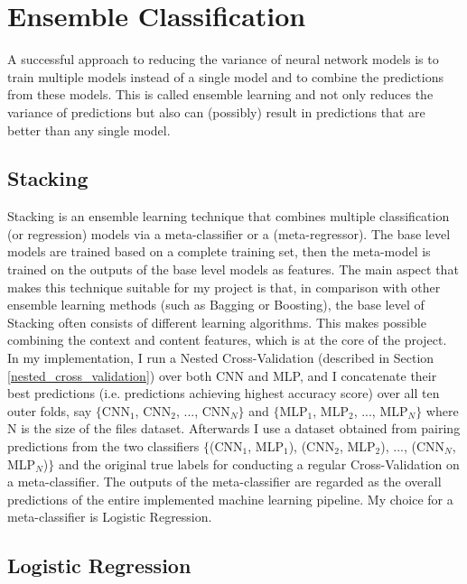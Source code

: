 \section{Ensemble Classification}

A successful approach to reducing the variance of neural network models is to train multiple models instead of a single model and to combine the predictions from these models. This is called ensemble learning and not only reduces the variance of predictions but also can (possibly) result in predictions that are better than any single model. \\

\subsection{Stacking}

Stacking is an ensemble learning technique that combines multiple classification (or regression) models via a meta-classifier or a (meta-regressor). The base level models are trained based on a complete training set, then the meta-model is trained on the outputs of the base level models as features. The main aspect that makes this technique suitable for my project is that, in comparison with other ensemble learning methods (such as Bagging or Boosting), the base level of Stacking often consists of different learning algorithms. This makes possible combining the context and content features, which is at the core of the project.\\

In my implementation, I run a Nested Cross-Validation (described in Section \ref{nested_cross_validation}) over both CNN and MLP, and I concatenate their best predictions (i.e. predictions achieving highest accuracy score) over all ten outer folds, say $\{$CNN$_1$, CNN$_2$, ..., CNN$_N$$\}$ and $\{$MLP$_1$, MLP$_2$, ..., MLP$_N$$\}$ where N is the size of the files dataset. 
Afterwards I use a dataset obtained from pairing predictions from the two classifiers $\{$(CNN$_1$, MLP$_1$), (CNN$_2$, MLP$_2$), ..., (CNN$_N$, MLP$_N$)$\}$ and the original true labels for conducting a regular Cross-Validation on a meta-classifier. The outputs of the meta-classifier are regarded as the overall predictions of the entire implemented machine learning pipeline. My choice for a meta-classifier is Logistic Regression. \\

\subsection{Logistic Regression}

